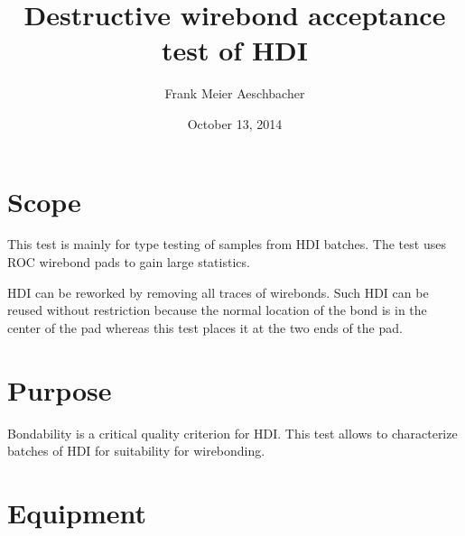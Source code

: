\documentclass[10pt]{unlsilabsop}
\title{Destructive wirebond acceptance test of HDI}
\date{October 13, 2014}
\author{Frank Meier Aeschbacher}
\begin{document}
\maketitle

\section{Scope}
This test is mainly for type testing of samples from HDI batches. The test uses ROC wirebond pads to gain large statistics.

HDI can be reworked by removing all traces of wirebonds. Such HDI can be reused without restriction because the normal location of the bond is in the center of the pad whereas this test places it at the two ends of the pad.

\section{Purpose}
Bondability is a critical quality criterion for HDI. This test allows to characterize batches of HDI for suitability for wirebonding.



\section{Equipment}
\end{document}

